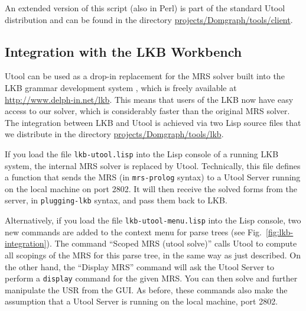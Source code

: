 An extended version of this script (also in Perl) is part of the
standard Utool distribution and can be found in the directory
\url{projects/Domgraph/tools/client}. 




\subsection{Integration with the LKB Workbench}
\label{sec:integration-lkb}


Utool can be used as a drop-in replacement for the MRS solver built
into the LKB grammar development system \cite{Copestake:LKB-Book},
which is freely available at \url{http://www.delph-in.net/lkb}. This means that users of the
LKB now have easy access to our solver, which is considerably faster
than the original MRS solver. The integration between LKB and Utool is
achieved via two Lisp source files that we distribute in the directory
\url{projects/Domgraph/tools/lkb}.

If you load the file \verb|lkb-utool.lisp| into the Lisp console
of a running LKB system, the internal MRS solver is replaced by
Utool. Technically, this file defines a function that sends the MRS
(in \verb?mrs-prolog? syntax) to a Utool Server running on the local
machine on port 2802. It will then receive the solved forms from the
server, in \verb?plugging-lkb? syntax, and pass them back to LKB.

 Alternatively, if you load the file \verb|lkb-utool-menu.lisp|
into the Lisp console, two new commands are added to the context menu
for parse trees (see Fig.~\ref{fig:lkb-integration}). The command
``Scoped MRS (utool solve)'' calls Utool to compute all scopings of
the MRS for this parse tree, in the same way as just described. On the
other hand, the ``Display MRS'' command will ask the Utool Server to
perform a \verb?display? command for the given MRS. You can then solve
and further manipulate the USR from the GUI. As before, these commands
also make the assumption that a Utool Server is running on the local
machine, port 2802.


